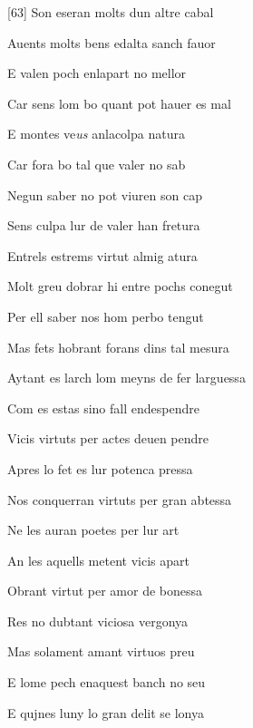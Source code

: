 \documentclass[12pt]{article}
\begin{document}
\begin{estrofa}

 [63] Son eseran molts dun altre cabal

 Auents molts bens edalta sanch fauor

 E valen poch enlapart no mellor

 Car sens lom bo quant pot hauer es mal

 E montes ve\textit{us} anlacolpa natura

 Car fora bo tal que valer no sab

 Negun saber no pot viuren son cap

 Sens culpa lur de valer han fretura

\end{estrofa}



\begin{estrofa}

 Entrels estrems virtut almig atura

 Molt greu dobrar hi entre pochs conegut

 Per ell saber nos hom perbo tengut

 Mas fets hobrant forans dins tal mesura

 Aytant es larch lom meyns de fer larguessa

 Com es estas sino fall endespendre

 Vicis virtuts per actes deuen pendre

 Apres lo fet es lur potenca pressa

\end{estrofa}



\begin{estrofa}

 Nos conquerran virtuts per gran abtessa

 Ne les auran poetes per lur art

 An les aquells metent vicis apart

 Obrant virtut per amor de bonessa

 Res no dubtant viciosa vergonya

 Mas solament amant virtuos preu

 E lome pech enaquest banch no seu

 E qujnes luny lo gran delit se lonya

\end{estrofa}
\end{document}
